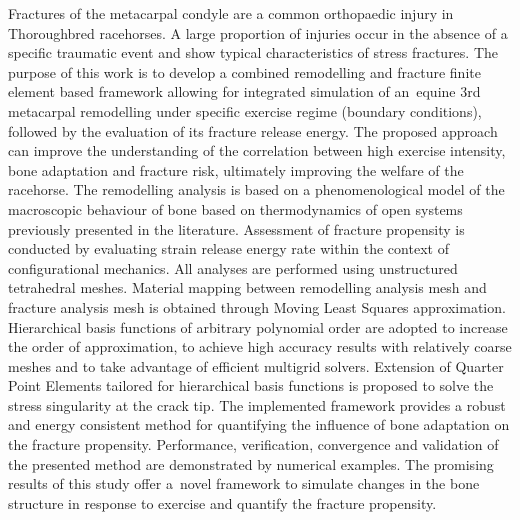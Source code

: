 \documentclass[11pt]{acmeArticle}
\numberwithin{equation}{section}
\begin{document}
{\small 
	Fractures of the metacarpal condyle are a common orthopaedic injury in Thoroughbred racehorses.  
	A large proportion of injuries occur in the absence of a specific traumatic event and show typical characteristics of stress fractures. 
	The purpose of this work is to develop a combined remodelling and fracture finite element based framework allowing for integrated simulation of an~equine 3rd metacarpal remodelling under specific exercise regime (boundary conditions), followed by the evaluation of its fracture release energy. 
	The proposed approach can improve the understanding of the correlation between high exercise intensity, bone adaptation and fracture 
	risk, ultimately improving the welfare of the racehorse. 
	The remodelling analysis is based on a phenomenological model of the macroscopic behaviour of bone based on thermodynamics of open 
	systems previously presented in the literature. 
	Assessment of fracture propensity is conducted by evaluating strain release energy rate within the context of configurational mechanics. 
	All analyses are performed using unstructured tetrahedral meshes. 
	Material mapping between remodelling analysis mesh and fracture analysis mesh is obtained through Moving Least Squares approximation. 
	Hierarchical basis functions of arbitrary polynomial order are adopted to increase the order of approximation, to achieve high 
	accuracy results with relatively coarse meshes and to take advantage of efficient multigrid solvers.
	Extension of Quarter Point Elements tailored for hierarchical basis functions is proposed to solve the stress singularity at the 
	crack tip.
	The implemented framework provides a robust and energy consistent method for quantifying the influence of bone adaptation on the
	 fracture propensity.
	Performance, verification, convergence and validation of the presented method are demonstrated by numerical examples.
	The promising results of this study offer a~novel framework to simulate changes in the bone structure in response to exercise and 
	quantify the fracture propensity.
	 
	
}
\end{document}
